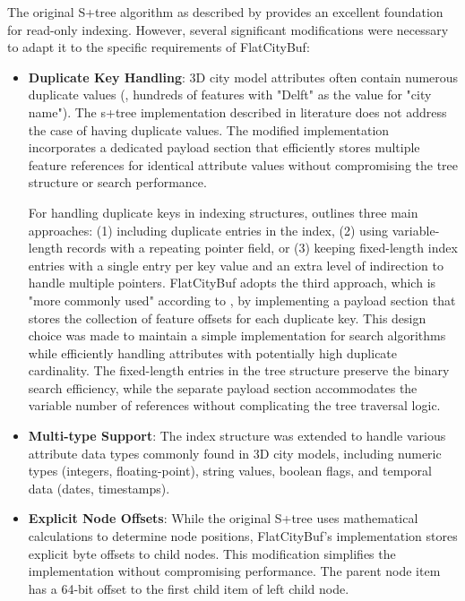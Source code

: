 The original S+tree algorithm as described by \citet{static_b_trees} provides an excellent foundation for read-only indexing. However, several significant modifications were necessary to adapt it to the specific requirements of FlatCityBuf:

\begin{itemize}
  \item \textbf{Duplicate Key Handling}: 3D city model attributes often contain numerous duplicate values (\eg, hundreds of features with "Delft" as the value for "city name"). The \ac{s+tree} implementation described in literature \citep{static_b_trees} does not address the case of having duplicate values. The modified implementation incorporates a dedicated payload section that efficiently stores multiple feature references for identical attribute values without compromising the tree structure or search performance.

    For handling duplicate keys in indexing structures, \citet{ramez_2015} outlines three main approaches: (1) including duplicate entries in the index, (2) using variable-length records with a repeating pointer field, or (3) keeping fixed-length index entries with a single entry per key value and an extra level of indirection to handle multiple pointers. FlatCityBuf adopts the third approach, which is "more commonly used" according to \citet{ramez_2015}, by implementing a payload section that stores the collection of feature offsets for each duplicate key. This design choice was made to maintain a simple implementation for search algorithms while efficiently handling attributes with potentially high duplicate cardinality. The fixed-length entries in the tree structure preserve the binary search efficiency, while the separate payload section accommodates the variable number of references without complicating the tree traversal logic.

  \item \textbf{Multi-type Support}: The index structure was extended to handle various attribute data types commonly found in 3D city models, including numeric types (integers, floating-point), string values, boolean flags, and temporal data (dates, timestamps).

  \item \textbf{Explicit Node Offsets}: While the original S+tree uses mathematical calculations to determine node positions, FlatCityBuf's implementation stores explicit byte offsets to child nodes. This modification simplifies the implementation without compromising performance. The parent node item has a 64-bit offset to the first child item of left child node.


\end{itemize}
